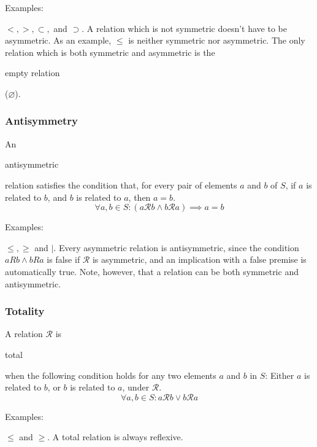 \documentclass[11pt]{article}
\theoremstyle{plain}
\theoremstyle{definition}
\begin{document}
\noindent \begin{em}Examples:\end{em} $ <, >, \subset, $ and $ \supset $. A relation which is not symmetric doesn't have to be asymmetric. As an example, $ \le $ is neither symmetric nor asymmetric. The only relation which is both symmetric and asymmetric is the \begin{em}empty relation\end{em} ($ \varnothing $).

\subsubsection*{ Antisymmetry}
An \begin{em}antisymmetric\end{em} relation satisfies the condition that, for every pair of elements $ a $ and $ b $ of $ S $, if $ a $ is related to $ b $, and $ b $ is related to $ a $, then $ a = b $. 
\begin{displaymath}
  \forall a, b \in S : (a\mathcal{R}b \wedge b\mathcal{R}a) \implies a = b
\end{displaymath}

\noindent \begin{em}Examples:\end{em} $ \le, \ge $ and $ | $. Every asymmetric relation is antisymmetric, since the condition $ aRb \wedge bRa $ is false if $ \mathcal{R} $ is asymmetric, and an implication with a false premise is automatically true.
Note, however, that a relation can be both symmetric and antisymmetric.

\subsubsection*{ Totality}
A relation $ \mathcal{R} $ is \begin{em}total\end{em} when the following condition holds for any two elements $ a $ and $ b $ in $ S $: Either $ a $ is related to $ b $, or $ b $ is related to $ a $, under $ \mathcal{R} $. %
\begin{displaymath}
	\forall a, b \in S : a\mathcal{R}b \vee b\mathcal{R}a
\end{displaymath}

\noindent \begin{em}Examples:\end{em} $ \le $ and $ \ge $. 
A total relation is always reflexive. 
\end{document}

